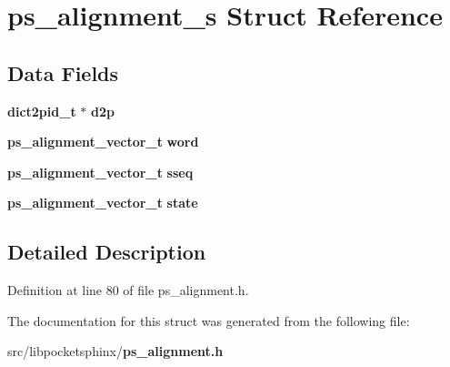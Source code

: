 \section{ps\+\_\+alignment\+\_\+s Struct Reference}
\label{structps__alignment__s}
\subsection*{Data Fields}
\begin{DoxyCompactItemize}
\item 
{\bf dict2pid\+\_\+t} $\ast$ {\bfseries d2p}\label{structps__alignment__s_a0c5367539e2ff9e5808672445c0a1303}

\item 
{\bf ps\+\_\+alignment\+\_\+vector\+\_\+t} {\bfseries word}\label{structps__alignment__s_af0a14378c50f80560198883436a84409}

\item 
{\bf ps\+\_\+alignment\+\_\+vector\+\_\+t} {\bfseries sseq}\label{structps__alignment__s_aa4b417c284b9e331431ea7a433f47e19}

\item 
{\bf ps\+\_\+alignment\+\_\+vector\+\_\+t} {\bfseries state}\label{structps__alignment__s_a1a62f5fce26879f312588de04c010538}

\end{DoxyCompactItemize}


\subsection{Detailed Description}


Definition at line 80 of file ps\+\_\+alignment.\+h.



The documentation for this struct was generated from the following file\+:\begin{DoxyCompactItemize}
\item 
src/libpocketsphinx/{\bf ps\+\_\+alignment.\+h}\end{DoxyCompactItemize}

